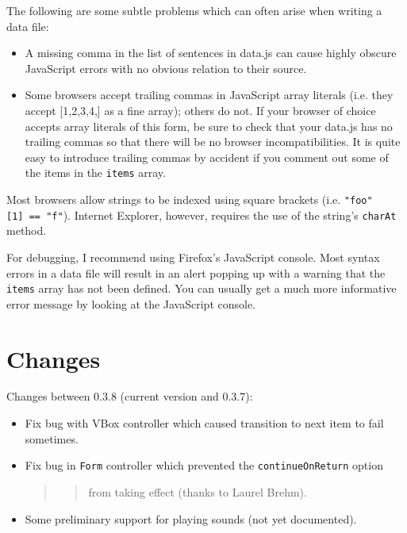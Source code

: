 \documentclass[
]{article}
\begin{document}
The following are some subtle problems which can often arise when
writing a data file:

\begin{itemize}
\item
  A missing comma in the list of sentences in data.js can cause highly
  obscure JavaScript errors with no obvious relation to their source.
\item
  Some browsers accept trailing commas in JavaScript array literals
  (i.e. they accept {[}1,2,3,4,{]} as a fine array); others do not. If
  your browser of choice accepts array literals of this form, be sure to
  check that your data.js has no trailing commas so that there will be
  no browser incompatibilities. It is quite easy to introduce trailing
  commas by accident if you comment out some of the items in the
  \texttt{items} array.
\end{itemize}

Most browsers allow strings to be indexed using square brackets (i.e.
\texttt{"foo"{[}1{]}\ ==\ "f"}). Internet Explorer, however, requires
the use of the string's \texttt{charAt} method.

For debugging, I recommend using Firefox's JavaScript console. Most
syntax errors in a data file will result in an alert popping up with a
warning that the \texttt{items} array has not been defined. You can
usually get a much more informative error message by looking at the
JavaScript console.

\hypertarget{changes}{%
\section{Changes}\label{changes}}

Changes between 0.3.8 (current version and 0.3.7):

\begin{itemize}
\item
  Fix bug with VBox controller which caused transition to next item to
  fail sometimes.
\item
  Fix bug in \texttt{Form} controller which prevented the
  \texttt{continueOnReturn} option

  \begin{quote}
  \begin{quote}
  from taking effect (thanks to Laurel Brehm).
  \end{quote}
  \end{quote}
\item
  Some preliminary support for playing sounds (not yet documented).
\end{itemize}
\end{document}
